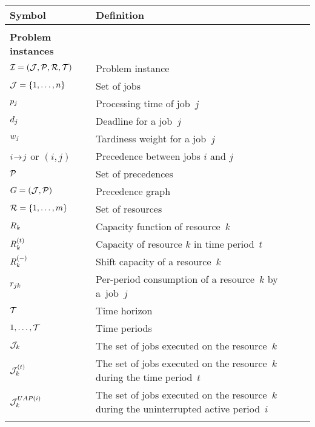  \label{sec:notation}

\begin{table}[!ht]
    \centering
    \begin{tabularx}{\textwidth}{p{}p{}}
        \textbf{Symbol} & \textbf{Definition} \\
        \hline
        \\

        \textbf{Problem instances}      & \cellrule \\
        $\mathcal{I} = (\mathcal{J}, \mathcal{P}, \mathcal{R}, \mathcal{T})$ & Problem instance \\
        $\mathcal{J} = \{ 1, \dots, n \}$     & Set of jobs \\
        $p_{j}$                  & Processing time of job~$j$ \\
        $d_{j}$                  & Deadline for a job~$j$ \\
        $w_{j}$           & Tardiness weight for a job~$j$ \\
        $i \hspace{-0.2em} \rightarrow \hspace{-0.2em} j$ or $(i,j)$  & Precedence between jobs $i$ and $j$ \\
        $\mathcal{P}$                  & Set of precedences \\
        $G = (\mathcal{J}, \mathcal{P})$     & Precedence graph \\
        $\mathcal{R} = \{1, \dots, m\}$  & Set of resources \\
        $R_{k}$                 & Capacity function of resource~$k$ \\
        $\capacity{k}{t}$               & Capacity of resource $k$ in time period~$t$ \\
        $\shiftcapacity{k}$             & Shift capacity of a resource~$k$ \\
        $r_{j k}$            & Per-period consumption of a resource~$k$ by a~job~$j$ \\
        $\mathcal{T}$                      & Time horizon \\
        $1, \dots, \mathcal{T}$            & Time periods \\
        $\mathcal{J}_{k}$
            & The set of jobs executed on the resource~$k$ \\
        $\mathcal{J}_{k}^{(t)}$
            & The set of jobs executed on the resource~$k$ during the time period~$t$ \\
        $\mathcal{J}_{k}^{UAP(i)}$
            & The set of jobs executed on the resource~$k$ during the uninterrupted active period~$i$\\
        \\


\end{tabularx}
\end{table}
